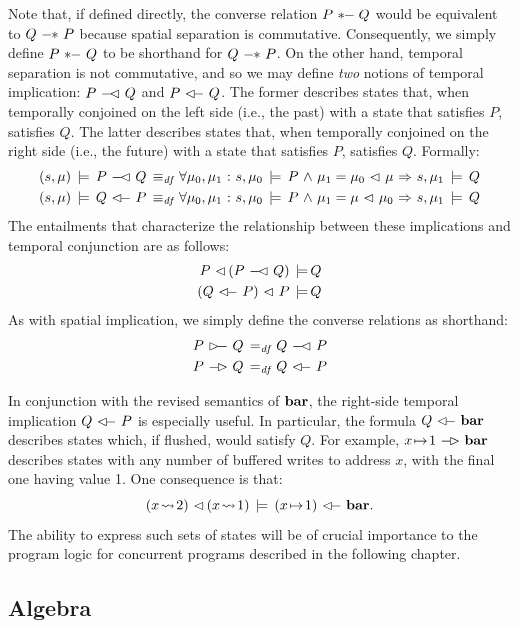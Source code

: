 \documentclass[11pt]{report}
\begin{document}
Note that, if defined directly, the converse relation $P \fsep\!\!\!\relbar Q$ would be equivalent to $Q \fsepi P$ because spatial separation is commutative. Consequently, we simply define $P \fsepic Q$ to be shorthand for $Q \fsepi P$. On the other hand, temporal separation is not commutative, and so we may define \emph{two} notions of temporal implication: $P \fseqli Q$ and $P \fseqri Q$. The former describes states that, when temporally conjoined on the left side (i.e., the past) with a state that satisfies $P$, satisfies $Q$. The latter describes states that, when temporally conjoined on the right side (i.e., the future) with a state that satisfies $P$, satisfies $Q$. Formally: \begin{align*} (s,\mu) \sentails P \fseqli Q \iffdef & \forall \mu_0,\mu_1 \st s,\mu_0 \sentails P \conj \mu_1 = \mu_0 \fseq \mu \onlyif  s,\mu_1 \sentails Q \\
(s,\mu) \sentails Q \fseqri P \iffdef & \forall \mu_0,\mu_1 \st s,\mu_0 \sentails P \conj \mu_1 = \mu \fseq \mu_0 \onlyif  s,\mu_1 \sentails Q \end{align*} The entailments that characterize the relationship between these implications and temporal conjunction are as follows: \begin{align*}
  P \fseq (P \fseqli Q) \sentails & Q \\ 
  (Q \fseqri P) \fseq P \sentails & Q \\ 
\end{align*} As with spatial implication, we simply define the converse relations as shorthand: \begin{align*}
  P \fseqlic Q \eqdef & Q \fseqli P \\
  P \fseqric Q \eqdef & Q \fseqri P \\
\end{align*}

In conjunction with the revised semantics of $\mathbf{bar}$, the right-side temporal implication $Q \fseqri P$ is especially useful. In particular, the formula $Q \fseqri \fbaru$ describes states which, if flushed, would satisfy $Q$. For example, $x \fpointsto 1 \fseqric \fbaru$ describes states with any number of buffered writes to address $x$, with the final one having value 1. One consequence is that: \[(x \fwriteu 2) \fseq (x \fwriteu 1) \sentails (x \fpointsto 1) \fseqri \fbaru.\] The ability to express such sets of states will be of crucial importance to the program logic for concurrent programs described in the following chapter. 


\subsection{Algebra}
\label{sec:sequential-algebra}
\end{document}
